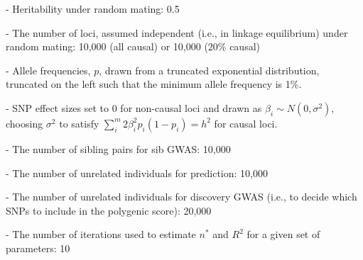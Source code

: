 \documentclass[hidelinks, 12pt]{article}
\begin{document}
- Heritability under random mating: 0.5

- The number of loci, assumed independent (i.e., in linkage equilibrium) under random mating: 10,000 (all causal) or 10,000 (20\% causal)

- Allele frequencies, $p$, drawn from a truncated exponential distribution, truncated on the left such that the minimum allele frequency is 1\%.

- SNP effect sizes set to 0 for non-causal loci and drawn as $\beta_i\sim N(0,\sigma^2)$, choosing $\sigma^2$ to satisfy $\sum_i^m2\beta_i^2p_i(1-p_i)=h^2$ for causal loci.

- The number of sibling pairs for sib GWAS: 10,000

- The number of unrelated individuals for prediction: 10,000

- The number of unrelated individuals for discovery GWAS (i.e., to decide which SNPs to include in the polygenic score): 20,000

- The number of iterations used to estimate $n^*$ and $R^2$ for a given set of parameters: 10
\pagebreak
\end{document}
